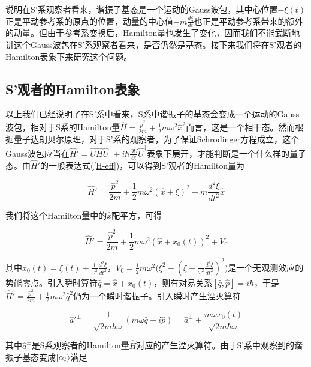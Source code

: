 \documentclass[a4paper]{article}
\begin{document}
        说明在S'系观察者看来，谐振子基态是一个运动的Gauss波包，其中心位置$-\xi(t)$正是平动参考系的原点的位置，动量的中心值$-m\frac{d\xi}{dt}$也正是平动参考系带来的额外的动量。但由于参考系变换后，Hamilton量也发生了变化，因而我们不能武断地讲这个Gauss波包在S'系观察者看来，是否仍然是基态。接下来我们将在S'观者的Hamilton表象下来研究这个问题。

    \subsection{S'观者的Hamilton表象}

        以上我们已经说明了在S'系中看来，S系中谐振子的基态会变成一个运动的Gauss波包，相对于S系的Hamilton量$\hat{H}=\frac{\hat{p}^2}{2m}+\frac{1}{2}m\omega^2\hat{x}^2$而言，这是一个相干态。然而根据量子达朗贝尔原理，对于S'系的观察者，为了保证Schrodinger方程成立，这个Gauss波包应当在$\hat{H}'=\hat{U}\hat{H}\hat{U}^\dagger+i\hbar\frac{\partial\hat{U}}{\partial t}\hat{U}^\dagger$表象下展开，才能判断是一个什么样的量子态。由$\hat{H}'$的一般表达式(\ref{H-eff})，可以得到S'观者的Hamilton量为

        \begin{equation}
            \hat{H}'=\frac{\hat{p}^2}{2m}+\frac{1}{2}m\omega^2(\hat{x}+\xi)^2+m\frac{d^2\xi}{dt^2}\hat{x}
        \end{equation}

        我们将这个Hamilton量中的$\hat{x}$配平方，可得

        \begin{equation}\label{H'-SHO}
            \hat{H}'=\frac{\hat{p}^2}{2m}+\frac{1}{2}m\omega^2(\hat{x}+x_0(t))^2+V_0
        \end{equation}

        其中$x_0(t)=\xi(t)+\frac{1}{\omega^2}\frac{d^2\xi}{dt^2}$，$V_0=\frac{1}{2}m\omega^2\bigl(\xi^2-(\xi+\frac{1}{\omega^2}\frac{d^2\xi}{dt^2})^2\bigr)$是一个无观测效应的势能零点。引入瞬时算符$\hat{q}=\hat{x}+x_0(t)$，则有对易关系$[\hat{q},\hat{p}]=i\hbar$，于是$\hat{H}'=\frac{\hat{p}^2}{2m}+\frac{1}{2}m\omega^2\hat{q}^2$仍为一个瞬时谐振子。引入瞬时产生湮灭算符

        \begin{equation}
            \hat{a}'^\pm = \frac{1}{\sqrt{2m\hbar\omega}}(m\omega\hat{q}\mp i\hat{p}) = \hat{a}^\pm + \frac{m\omega x_0(t)}{\sqrt{2m\hbar\omega}}
        \end{equation}

        其中$\hat{a}^\pm$是S系观察者的Hamilton量$\hat{H}$对应的产生湮灭算符。由于S'系中观察到的谐振子基态变成$\ket{\alpha_t}$满足
\end{document}
